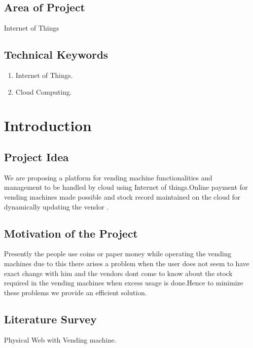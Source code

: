 \documentclass[oneside,a4paper,12pt]{report}
\begin{document}
\section{Area of Project}
Internet of Things
\section{Technical Keywords}

\begin{enumerate}
	 
\item Internet of Things.
\item Cloud Computing.

\end{enumerate}

			
\chapter{Introduction}
\section{Project Idea}

 We are proposing a platform for vending machine functionalities and management to be  handled by cloud using Internet of things.Online payment for vending machines made possible and stock record maintained on the cloud for dynamically updating the vendor .


\section{Motivation of the Project}  

 Presently the people use coins or paper money while operating the vending machines due to this there arises a problem when the user does not seem to have exact change with him and the vendors dont come to know about the stock required in the vending machines when excess usage is done.Hence to minimize these problems we provide an efficient solution.

\section{Literature Survey}
 Physical Web with Vending machine.
\end{document}
